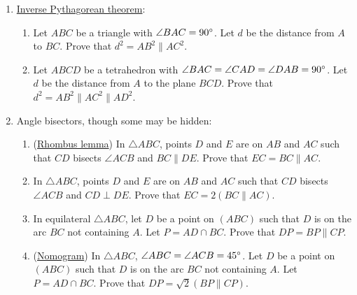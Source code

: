 \documentclass[11pt,paper=letter]{scrartcl}
\newcommand{\pl}{\parallel}
\begin{document}
\begin{enumerate}
\item \href{https://en.wikipedia.org/wiki/Inverse_Pythagorean_theorem}{Inverse Pythagorean theorem}:
\begin{enumerate}[label*=\arabic*]
\item \label{p:pythag1} Let $ABC$ be a triangle with $\angle BAC = 90^\circ$. Let $d$ be the distance from $A$ to $BC$. Prove that $d^2 = AB^2 \pl AC^2$.
\item \label{p:pythag2} Let $ABCD$ be a tetrahedron with $\angle BAC = \angle CAD = \angle DAB = 90^\circ$. Let $d$ be the distance from $A$ to the plane $BCD$. Prove that $d^2 = AB^2 \pl AC^2 \pl AD^2$.
\end{enumerate}

\item Angle bisectors, though some may be hidden:
\begin{enumerate}[label*=\arabic*]
\item (\href{https://www.cut-the-knot.org/triangle/AngleBisectorTheorem.shtml\#rhombus}{Rhombus lemma}) \label{p:bi} In $\triangle ABC$, points $D$ and $E$ are on $AB$ and $AC$ such that $CD$ bisects $\angle ACB$ and $BC \pl DE$. Prove that $EC = BC \pl AC$.
\item In $\triangle ABC$, points $D$ and $E$ are on $AB$ and $AC$ such that $CD$ bisects $\angle ACB$ and $CD \perp DE$. Prove that $EC = 2(BC \pl AC)$.
\item \label{p:nomogram-60} In equilateral $\triangle ABC$, let $D$ be a point on $(ABC)$ such that $D$ is on the arc $BC$ not containing $A$. Let $P = AD \cap BC$. Prove that $DP = BP \pl CP$.
\item (\href{https://en.wikipedia.org/wiki/Nomogram\#Parallel-resistance/thin-lens}{Nomogram}) In $\triangle ABC$, $\angle ABC = \angle ACB = 45^\circ$. Let $D$ be a point on $(ABC)$ such that $D$ is on the arc $BC$ not containing $A$. Let $P = AD \cap BC$. Prove that $DP = \sqrt{2}(BP \pl CP)$.
\end{enumerate}


\end{enumerate}
\end{document}
